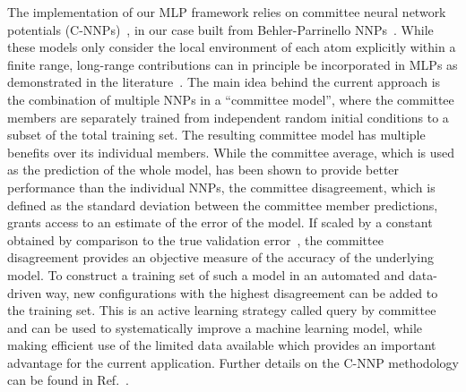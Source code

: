 \documentclass[aip,jcp,amsmath,amssymb,floatfix,reprint,citeautoscript,noeprint]{revtex4-1}
\begin{document}
\begin{bibunit}
%
The implementation of our MLP framework
relies on committee neural network potentials (C-NNPs)~\cite{Schran2020/10.1063/5.0016004},
in our case built from Behler-Parrinello
NNPs~\cite{Behler2007/10.1103/PhysRevLett.98.146401,
Behler2017/10.1002/anie.201703114}.
%
While these models only consider the local environment of each atom explicitly within a finite range,
long-range contributions can in principle be incorporated in MLPs as demonstrated in the literature~\cite{%
Artrith2011/10.1103/PhysRevB.83.153101,
Grisafi2019/10.1063/1.5128375,
Ko2021/10.1038/s41467-020-20427-2,
Yue2021/10.1063/5.0031215%
}.
%
The main idea behind the current approach is the combination of multiple NNPs
in a ``committee model'', where the committee members are separately trained from independent random initial conditions
to a subset of the total training set.
%
The resulting committee model has multiple benefits over its individual members.
%
While the committee average, which is used as the prediction of the whole model,
has been shown to provide better performance than the individual NNPs,
the committee disagreement, which is defined as the standard deviation
between the committee member predictions, grants access to an estimate of the
error of the model.
%
If scaled by a constant obtained by comparison to the true validation error~\cite{Imbalzano2021/10.1063/5.0036522},
the committee disagreement provides an objective measure of the accuracy of the underlying model.
%
To construct a training set of such a model in an automated and data-driven way,
new configurations with the highest disagreement can be added to the training set.
%
This is an active learning strategy called query by committee and can be used to systematically improve a machine learning model, while
making efficient use of the limited data available which provides an important advantage for the current application.
%
Further details on the C-NNP methodology can be found in Ref.~.



\end{bibunit}
\end{document}
